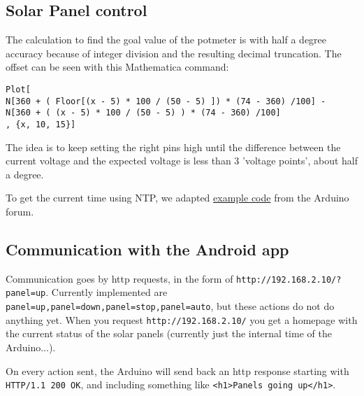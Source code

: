 \documentclass{article}
\begin{document}
		\subsection{Solar Panel control}
			The calculation to find the goal value of the potmeter is with half a degree accuracy because of integer division and the resulting decimal truncation. The offset can be seen with this Mathematica command:
			\begin{lstlisting}
Plot[
N[360 + ( Floor[(x - 5) * 100 / (50 - 5) ]) * (74 - 360) /100] - 
N[360 + ( (x - 5) * 100 / (50 - 5) ) * (74 - 360) /100]
, {x, 10, 15}]
			\end{lstlisting}
			The idea is to keep setting the right pins high until the difference between the current voltage and the expected voltage is less than 3 'voltage points', about half a degree.
			
			To get the current time using NTP, we adapted \href{http://forum.arduino.cc/index.php?topic=171941.0}{example code} from the Arduino forum.
			
		\subsection{Communication with the Android app}
			Communication goes by http requests, in the form of \verb|http://192.168.2.10/?panel=up|. Currently implemented are \verb|panel=up,panel=down,panel=stop,panel=auto|, but these actions do not do anything yet. When you request \verb|http://192.168.2.10/| you get a homepage with the current status of the solar panels (currently just the internal time of the Arduino...).
			
			On every action sent, the Arduino will send back an http response starting with \verb|HTTP/1.1 200 OK|, and including something like \verb|<h1>Panels going up</h1>|.
	
\end{document}
